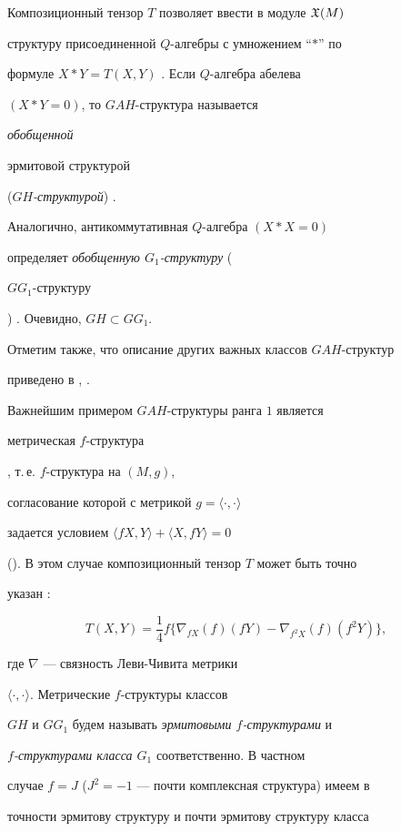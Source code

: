 Композиционный тензор $T$ позволяет ввести в модуле $\frak{X}(M)$


структуру присоединенной $Q$-алгебры с умножением ``$\ast$'' по


формуле $X\ast Y=T(X,Y)$ \cite{4}. Если $Q$-алгебра абелева


$(X\ast Y=0)$, то $GAH$-структура называется {\it обобщенной


эрмитовой структурой} ({\it $GH$-структурой}) \cite{4}.


Аналогично, антикоммутативная $Q$-алгебра $(X\ast X=0)$


определяет {\it обобщенную $G_1$-структуру} ({\it


$GG_1$-структуру}) \cite{4}. Очевидно, $GH\subset GG_1$.


Отметим также, что описание других важных классов $GAH$-структур


приведено в \cite{4}, \cite{3}.





Важнейшим примером $GAH$-структуры ранга $1$ является {\it


метрическая $f$-структура}, т.\,е. $f$-структура на $(M,g)$,


согласование которой с метрикой $g=\langle\cdot,\cdot\rangle$


задается условием $\langle fX,Y\rangle + \langle X,fY\rangle=0$


(\cite{4}). В этом случае композиционный тензор $T$ может быть точно


указан \cite{4}:


\begin{equation}\label{1}


T(X,Y)=\frac{1}{4}f\{\nabla_{f


X}(f)(fY)-\nabla_{f^2X}(f)(f^2Y)\},


\end{equation}


где $\nabla$ --- связность Леви-Чивита метрики


$\langle\cdot,\cdot\rangle$. Метрические $f$-структуры классов


$GH$ и $GG_1$ будем называть {\it эрмитовыми $f$-струк\-турами} и


{\it $f$-структурами класса $G_1$} соответственно. В частном


случае $f=J$ ($J^2=-1$ --- почти комплексная структура) имеем в


точности эрмитову структуру и почти эрмитову структуру класса



